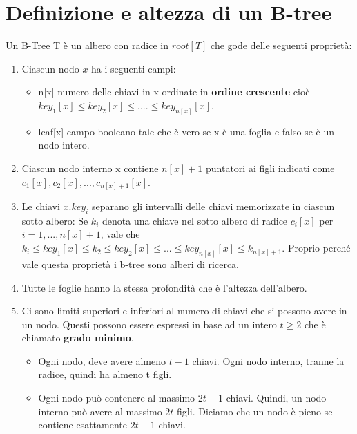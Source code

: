 \section{Definizione e altezza di un B-tree}
Un B-Tree T è un albero con radice in $root[T]$ che gode delle seguenti proprietà:
\begin{enumerate}
    \item Ciascun nodo $x$ ha i seguenti campi:
    \begin{itemize}
        \item n[x] numero delle chiavi in x ordinate in \textbf{ordine crescente} cioè $key_1[x]\leq key_2[x]\leq....\leq key_{n[x]}[x]$.
        \item leaf[x] campo booleano tale che è vero se x è una foglia e falso se è un nodo intero.
    \end{itemize}
    \item Ciascun nodo interno x contiene $n[x]+1$ puntatori ai figli indicati come $c_1[x], c_2[x],...,c_{n[x]+1}[x]$.
    \item Le chiavi $x.key_i$ separano gli intervalli delle chiavi memorizzate in ciascun sotto albero: Se $k_i$ denota una chiave nel sotto albero di radice $c_i[x]$ per $i=1,...,n[x]+1$, vale che $k_i\leq key_1[x]\leq k_2 \leq key_2[x] \le...\leq key_{n[x]}[x]\leq k_{n[x]+1}$. Proprio perché vale questa proprietà i b-tree sono alberi di ricerca. 
    \item Tutte le foglie hanno la stessa profondità che è l'altezza dell'albero.
    \item Ci sono limiti superiori e inferiori al numero di chiavi che si possono avere in un nodo. Questi possono essere espressi in base ad un intero $t\geq 2$ che è chiamato \textbf{grado minimo}.
    \begin{itemize}
        \item Ogni nodo, deve avere almeno $t-1$ chiavi. Ogni nodo interno, tranne la radice, quindi ha almeno t figli.
        \item Ogni nodo può contenere al massimo $2t-1$ chiavi. Quindi, un nodo interno
        può avere al massimo $2t$ figli. Diciamo che un nodo è pieno se contiene
        esattamente $2t-1$ chiavi.
    \end{itemize}
\end{enumerate}

